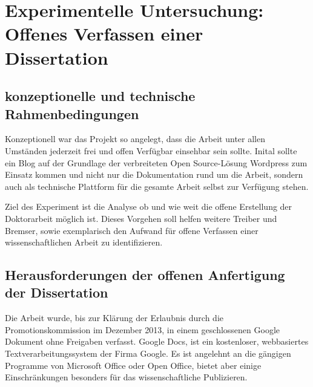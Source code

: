 \chapter{Experimentelle Untersuchung: Offenes Verfassen einer Dissertation}


\section{konzeptionelle und technische Rahmenbedingungen}

Konzeptionell war das Projekt so angelegt, dass die Arbeit unter allen Umständen jederzeit frei und offen Verfügbar einsehbar sein sollte. Inital sollte ein Blog auf der Grundlage der verbreiteten Open Source-Lösung Wordpress zum Einsatz kommen und nicht nur die Dokumentation rund um die Arbeit, sondern auch als technische Plattform für die gesamte Arbeit selbst zur Verfügung stehen.

Ziel des Experiment ist die Analyse ob und wie weit die offene Erstellung der Doktorarbeit möglich ist. Dieses Vorgehen soll helfen weitere Treiber und Bremser, sowie exemplarisch den Aufwand für offene Verfassen einer wissenschaftlichen Arbeit zu identifizieren.

\section{Herausforderungen der offenen Anfertigung der Dissertation}

Die Arbeit wurde, bis zur Klärung der Erlaubnis durch die Promotionskommission im Dezember 2013, in einem geschlossenen Google Dokument ohne Freigaben verfasst. Google Docs, ist ein kostenloser, webbasiertes Textverarbeitungssystem der Firma Google. Es ist angelehnt an die gängigen Programme von Microsoft Office oder Open Office, bietet aber einige Einschränkungen besonders für das wissenschaftliche Publizieren.

